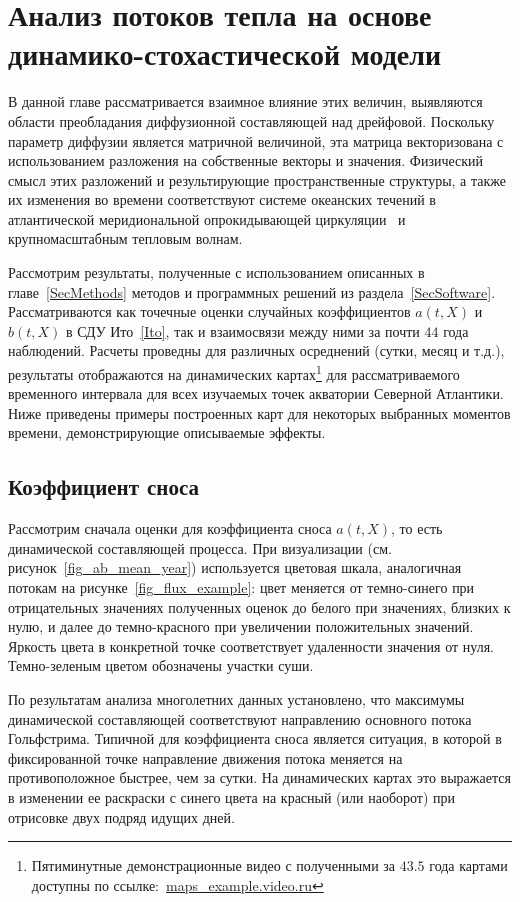 \chapter{Анализ потоков тепла на основе динамико-стохастической модели}
\label{SecAnalysis}
В данной главе рассматривается взаимное влияние этих величин, выявляются области преобладания диффузионной составляющей над дрейфовой. Поскольку параметр диффузии является матричной величиной, эта матрица векторизована с использованием разложения на собственные векторы и значения. Физический смысл этих разложений и результирующие пространственные структуры, а также их изменения во времени соответствуют системе океанских течений в атлантической меридиональной опрокидывающей циркуляции~\cite{Caesar2018} и крупномасштабным тепловым волнам.

Рассмотрим результаты, полученные с использованием описанных в главе~\ref{SecMethods} методов и программных решений из раздела~\ref{SecSoftware}. Рассматриваются как точечные оценки случайных коэффициентов $a(t,X)$ и $b(t, X)$ в СДУ Ито~\eqref{Ito}, так и взаимосвязи между ними за почти $44$ года наблюдений. Расчеты проведны для различных осреднений (сутки, месяц и т.д.), результаты отображаются на динамических картах\footnote{Пятиминутные демонстрационные видео с полученными за $43.5$ года картами доступны по ссылке:~\url{maps_example.video.ru}} для рассматриваемого временного интервала для всех изучаемых точек акватории Северной Атлантики. Ниже приведены примеры построенных карт для некоторых выбранных моментов времени, демонстрирующие описываемые эффекты.


\section{Коэффициент сноса}
Рассмотрим сначала оценки для коэффициента сноса $a(t,X)$, то есть динамической составляющей процесса.
При визуализации (см. рисунок~\ref{fig_ab_mean_year}) используется цветовая шкала, аналогичная потокам на рисунке~\ref{fig_flux_example}: цвет меняется от темно-синего при отрицательных значениях полученных оценок до белого при значениях, близких к нулю, и далее до темно-красного при увеличении положительных значений. Яркость цвета в конкретной точке соответствует удаленности значения от нуля. Темно-зеленым цветом обозначены участки суши.

По результатам анализа многолетних данных установлено, что максимумы динамической составляющей соответствуют направлению основного потока Гольфстрима. Типичной для коэффициента сноса является ситуация, в которой в фиксированной точке направление движения потока меняется на противоположное быстрее, чем за сутки. На динамических картах это выражается в изменении ее раскраски с синего цвета на красный (или наоборот) при отрисовке двух подряд идущих дней.


